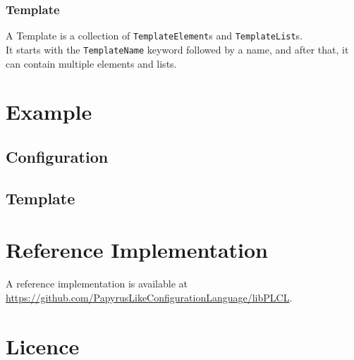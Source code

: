 \documentclass[12pt]{article}
\begin{document}
    \subsubsection{Template}
    A Template is a collection of \texttt{TemplateElement}s and \texttt{TemplateList}s. \\
    It starts with the \texttt{TemplateName} keyword followed by a name, and after that, it can contain multiple elements and lists.

    \newpage

    \section{Example}
    \begin{minipage}[t]{0.49\textwidth}
        \subsection{Configuration}
        
    \end{minipage}
    \begin{minipage}[t]{0.49\textwidth}
        \subsection{Template}
        
    \end{minipage}

    \newpage
    \section{Reference Implementation}
    A reference implementation is available at \url{https://github.com/PapyrusLikeConfigurationLanguage/libPLCL}.

    \section{Licence}
    \doclicenseThis
\end{document}
